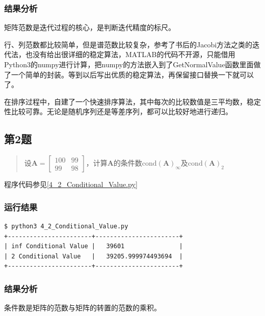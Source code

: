 \subsubsection{结果分析}

矩阵范数是迭代过程的核心，是判断迭代精度的标尺。

行、列范数都比较简单，但是谱范数比较复杂，参考了书后的Jacobi方法之类的迭代法，也没有给出很详细的稳定算法，MATLAB的代码不开源，只能借用Python3的numpy进行计算，把numpy的方法嵌入到了GetNormalValue函数里面做了一个简单的封装。等到以后写出优质的稳定算法，再保留接口替换一下就可以了。

在排序过程中，自建了一个快速排序算法，其中每次的比较数值是三平均数，稳定性比较可靠。无论是随机序列还是等差序列，都可以比较好地进行递归。


\subsection{第2题}
\begin{quote}
    {\kaishu
        设$\mathbf{A}=\left[ \begin{array}{rr}{100} & {99} \\ {99} & {98}\end{array}\right]$，计算$\mathbf{A}$的条件数$\mathrm{cond}(\mathbf{A})_{\infty}$及$\mathrm{cond}(\mathbf{A})_{2}$
    }
\end{quote}

程序代码参见\ref{4_2_Conditional_Value.py}

\subsubsection{运行结果}

\begin{lstlisting}[style = bash]
$ python3 4_2_Conditional_Value.py 
+-----------------------+-----------------------+
| inf Conditional Value |   39601               |
| 2 Conditional Value   |   39205.999974493694  |
+-----------------------+-----------------------+
\end{lstlisting}

\subsubsection{结果分析}
条件数是矩阵的范数与矩阵的转置的范数的乘积。

